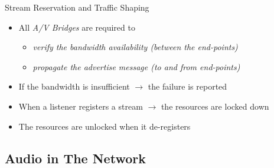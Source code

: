 \documentclass{beamer}
\begin{document}
\begin{frame}[allowframebreaks]{ Stream Reservation and Traffic Shaping }
\break

\begin{itemize}
	\item All \emph{A/V Bridges} are required to

	\begin{itemize}
		\item \emph{verify the bandwidth availability (between the end-points)}
		\item \emph{propagate the advertise message (to and from end-points)}
	\end{itemize}

	\item If the bandwidth is insufficient \newline
		$\rightarrow$ the failure is reported
	\item When a listener registers a stream \newline
		$\rightarrow$ the resources are locked down
	\item The resources are unlocked when it de-registers

\end{itemize}

\end{frame}


\subsection{Audio in The Network}
\end{document}
